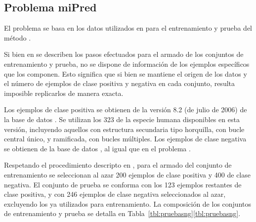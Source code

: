 %
%
\subsection{Problema miPred}
%
El problema \prob\mipred{} se basa en los datos utilizados en \cite{ng}
para el entrenamiento y prueba del método \work\mipred.

Si bien en \cite{ng} se describen los pasos efectuados para el armado
de los conjuntos de entrenamiento y prueba, no se dispone de
información de los ejemplos específicos que los componen.
Esto significa que si bien se mantiene el origen de los datos y el
número de ejemplos de clase positiva y negativa en cada conjunto,
resulta imposible replicarlos de manera exacta.

Los ejemplos de clase positiva se obtienen de la versión 8.2 (de julio
de 2006) de la base de datos \work{\mirbase}.
Se utilizan los 323  de la especie humana disponibles en
esta versión, incluyendo aquellos con estructura secundaria tipo
horquilla, con bucle central único, y ramificada, con bucles
múltiples.
Los ejemplos de clase negativa se obtienen de la base de datos
, al igual que en el problema \prob\tripletsvm.

Respetando el procedimiento descripto en \cite{ng}, para el armado del
conjunto de entrenamiento  se seleccionan al azar 200
ejemplos de clase positiva y 400 de clase negativa.
El conjunto de prueba  se conforma con los 123 ejemplos
restantes de clase positiva, y con 246 ejemplos de clase negativa
seleccionados al azar, excluyendo los ya utilizados para
entrenamiento.
La composición de los conjuntos de entrenamiento y prueba se detalla
en \iflatexml{}Tabla~\ref{tbl:pruebasng}\else\autoref{tbl:pruebasng}\fi.
